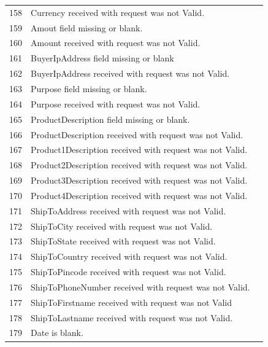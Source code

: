 \documentclass{article}
\newcommand{\xmark}{\ding{55}}
\begin{document}
\begin{longtable}{||c|p{12.5cm}||c|}
158 &Currency received with request was not Valid.& \textcolor{red} {\xmark} \\
159 &Amout field missing or blank.& \textcolor{red} {\xmark} \\
160 &Amount received with request was not Valid.& \textcolor{red} {\xmark} \\
161 &BuyerIpAddress field missing or blank& \textcolor{red} {\xmark} \\
162 &BuyerIpAddress received with request was not Valid.& \textcolor{red} {\xmark} \\
163 &Purpose field missing or blank.& \textcolor{red} {\xmark} \\
164 &Purpose received with request was not Valid.& \textcolor{red} {\xmark} \\
165 &ProductDescription field missing or blank.& \textcolor{red} {\xmark} \\
166 &ProductDescription received with request was not Valid.& \textcolor{red} {\xmark} \\
167 &Product1Description received with request was not Valid.& \textcolor{red} {\xmark} \\
168 &Product2Description received with request was not Valid.& \textcolor{red} {\xmark} \\
169 &Product3Description received with request was not Valid.& \textcolor{red} {\xmark} \\
170 &Product4Description received with request was not Valid.& \textcolor{red} {\xmark} \\
171 &ShipToAddress received with request was not Valid.& \textcolor{red} {\xmark} \\
172 &ShipToCity received with request was not Valid.& \textcolor{red} {\xmark} \\
173 &ShipToState received with request was not Valid.& \textcolor{red} {\xmark} \\
174 &ShipToCountry received with request was not Valid.& \textcolor{red} {\xmark} \\
175 &ShipToPincode received with request was not Valid.& \textcolor{red} {\xmark} \\
176 &ShipToPhoneNumber received with request was not Valid.& \textcolor{red} {\xmark} \\
177 &ShipToFirstname received with request was not Valid& \textcolor{red} {\xmark} \\
178 &ShipToLastname received with request was not Valid.& \textcolor{red} {\xmark} \\
179 &Date is blank.& \textcolor{red} {\xmark} \\

\end{longtable}
\end{document}
